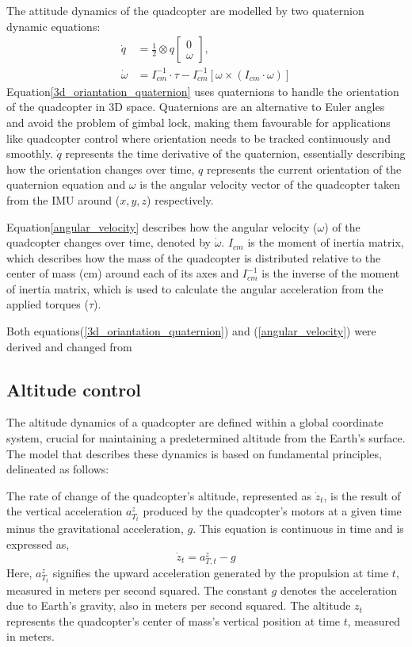 \documentclass{report}
\begin{document}
The attitude dynamics of the quadcopter are modelled by two quaternion dynamic
equations:
\begin{align}
    \dot{q} &= \frac{1}{2} \otimes q\begin{bmatrix} 0 \\ \omega \end{bmatrix}, \label{3d_oriantation_quaternion}\\
    \dot{\omega} &= I_{cm}^{-1} \cdot \tau - I_{cm}^{-1} \left[ \omega \times (I_{cm} \cdot \omega) \right] \label{angular_velocity}
\end{align}
Equation\eqref{3d_oriantation_quaternion} uses quaternions to handle the orientation of the quadcopter in 3D space. Quaternions are an
alternative to Euler angles and avoid the problem of gimbal lock, making them
favourable for applications like quadcopter control where orientation needs to
be tracked continuously and smoothly. \(\dot{q}\) represents the time derivative
of the quaternion, essentially describing how the orientation changes over time,
\(q\) represents the current orientation of the quaternion equation and
\(\omega\) is the angular velocity vector of the quadcopter taken from the IMU
around (\(x, y, z\)) respectively.

Equation\eqref{angular_velocity} describes how the angular velocity (\(\omega\))
of the quadcopter changes over time, denoted by \(\dot \omega\). \(I_{cm}\) is
the moment of inertia matrix, which describes how the mass of the quadcopter is
distributed relative to the center of mass (cm) around each of its axes and
\(I_{cm}^{-1}\) is the  inverse of the moment of inertia matrix, which is used
to calculate the angular acceleration from the applied torques (\(\tau\)).

Both equations(\eqref{3d_oriantation_quaternion}) and (\eqref{angular_velocity}) were
derived and changed from \cite{QuaternionBasedAttitudeControl}

\subsection{Altitude control}\label{Altitude_control} The altitude dynamics
of a quadcopter are defined within a global coordinate system, crucial for
maintaining a predetermined altitude from the Earth's surface. The model that
describes these dynamics is based on fundamental principles, delineated as
follows:

The rate of change of the quadcopter's altitude, represented as \( \dot{z}_t \),
is the result of the vertical acceleration \( a^z_{T_t} \) produced by the
quadcopter's motors at a given time minus the gravitational acceleration, \( g
\). This equation is continuous in time and is expressed as,
\begin{equation}
\dot{z}_t = a^z_{T,t} - g
\end{equation}
\noindent
Here, \( a^z_{T_t} \) signifies the upward acceleration generated by the
propulsion at time \( t \), measured in meters per second squared. The constant
\( g \) denotes the acceleration due to Earth's gravity, also in meters per
second squared. The altitude \( z_t \) represents the quadcopter's center of
mass's vertical position at time \( t \), measured in meters.
\end{document}
